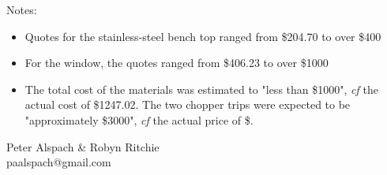 \documentclass[12pt]{article} %
\begin{document}
Notes:

\begin{itemize}
 \item Quotes for the stainless-steel bench top ranged from \$204.70 to over \$400
 \item For the window, the quotes ranged from \$406.23 to over \$1000
 \item The total cost of the materials was estimated to "less than \$1000", \textit{cf} the actual cost of \$1247.02.  The two chopper trips were expected to be "approximately \$3000", \textit{cf} the actual price of \$.
\end{itemize}

\vspace{2cm}
Peter Alspach \& Robyn Ritchie\\
paalspach@gmail.com
\end{document}
